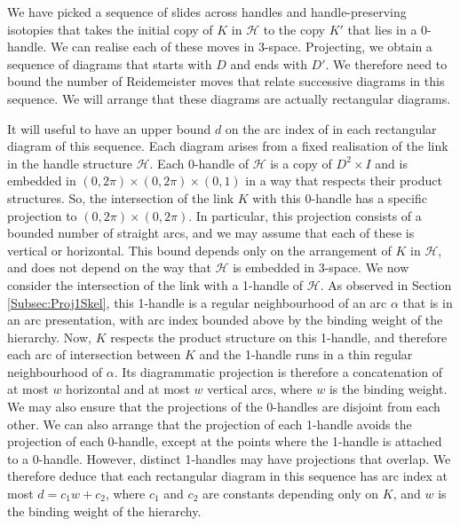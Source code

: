 \documentclass[oneside]{amsart}
\numberwithin{equation}{section}
\theoremstyle{plain}
\theoremstyle{definition}
\begin{document}
We have picked a sequence of slides across handles and handle-preserving isotopies that takes the initial copy of $K$ in $\mathcal{H}$
to the copy $K'$ that lies in a 0-handle. We can realise each of these moves in 3-space. Projecting, we
obtain a sequence of diagrams that starts with $D$ and ends with $D'$. We therefore
need to bound the number of Reidemeister moves that relate successive diagrams in this
sequence. We will arrange that these diagrams are actually rectangular diagrams.


It will useful to have an upper bound $d$ on the arc index of in each rectangular diagram of this sequence.
Each diagram arises from a fixed realisation of the link in the handle structure $\mathcal{H}$.
Each 0-handle of $\mathcal{H}$ is a copy of $D^2 \times I$ and is embedded in $(0,2\pi) \times (0,2\pi) \times (0,1)$ 
in a way that respects their product structures. So, the intersection of the link $K$ with
this 0-handle has a specific projection to $(0,2\pi) \times (0,2\pi)$. In particular, this projection consists of
a bounded number of straight arcs, and we may assume that each of these is vertical or horizontal. This bound depends only on the arrangement of $K$
in $\mathcal{H}$, and does not depend on the way that $\mathcal{H}$ is embedded in 3-space.
We now consider the intersection of the link with a 1-handle of $\mathcal{H}$. As observed in Section \ref{Subsec:Proj1Skel},
this 1-handle is a regular neighbourhood of an arc $\alpha$ that is in an arc presentation,
with arc index bounded above by the binding weight of the hierarchy. Now, $K$ respects
the product structure on this 1-handle, and therefore each arc of intersection between $K$
and the 1-handle runs in a thin regular neighbourhood of $\alpha$. Its diagrammatic
projection is therefore a concatenation of at most $w$ horizontal and at most $w$ vertical arcs, where $w$ is
the binding weight. We may also ensure that the projections of the 0-handles
are disjoint from each other. We can also arrange that the projection of each 1-handle
avoids the projection of each 0-handle, except at the points where the 1-handle is
attached to a 0-handle. However, distinct 1-handles may have projections that overlap.
We therefore deduce that each rectangular diagram in this sequence has arc index at most $d = c_1 w + c_2$, 
where $c_1$ and $c_2$ are constants depending only on $K$, and $w$ is
the binding weight of the hierarchy. 
\end{document}
